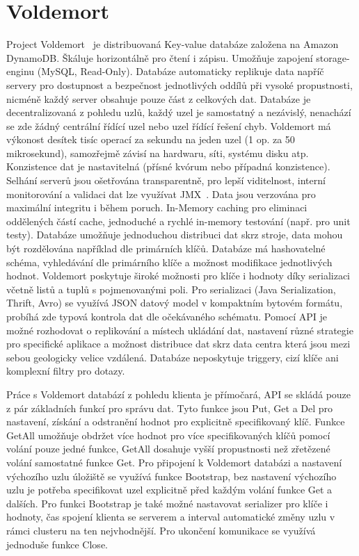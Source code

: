 \documentclass[czech,master,dept460,male,csharp,cpdeclaration]{diploma}
\begin{document}
	\section{Voldemort}
	
	Project Voldemort~\cite{voldemort} je distribuovaná Key-value databáze založena na Amazon DynamoDB. Škáluje horizontálně pro čtení i zápisu. Umožňuje zapojení storage-enginu (MySQL, Read-Only). Databáze automaticky replikuje data napříč servery pro dostupnost a bezpečnost jednotlivých oddílů při vysoké propustnosti, nicméně každý server obsahuje pouze část z celkových dat. Databáze je decentralizovaná z pohledu uzlů, každý uzel je samostatný a nezávislý, nenachází se zde žádný centrální řídící uzel nebo uzel řídící řešení chyb. Voldemort má výkonost desítek tisíc operací za sekundu na jeden uzel (1 op. za 50 mikrosekund), samozřejmě závisí na hardwaru, síti, systému disku atp. Konzistence dat je nastavitelná (přísné kvórum nebo případná konzistence). Selhání serverů jsou ošetřována transparentně, pro lepší viditelnost, interní monitorování a validaci dat lze využívat JMX~\cite{jmx}. Data jsou verzována pro maximální integritu i během poruch. In-Memory caching pro eliminaci oddělených částí cache, jednoduché a rychlé in-memory testování (např. pro unit testy). Databáze umožňuje jednoduchou distribuci dat skrz stroje, data mohou být rozdělována například dle primárních klíčů. Databáze má hashovatelné schéma, vyhledávání dle primárního klíče a možnost modifikace jednotlivých hodnot. Voldemort poskytuje široké možnosti pro klíče i hodnoty díky serializaci včetně listů a tuplů s pojmenovanými poli. Pro serializaci (Java Serialization, Thrift, Avro) se využívá JSON datový model v kompaktním bytovém formátu, probíhá zde typová kontrola dat dle očekávaného schématu. Pomocí API je možné rozhodovat o replikování a místech ukládání dat, nastavení různé strategie pro specifické aplikace a možnost distribuce dat skrz data centra která jsou mezi sebou geologicky velice vzdálená. Databáze neposkytuje triggery, cizí klíče ani komplexní filtry pro dotazy.
	
	Práce s Voldemort databází z pohledu klienta je přímočará, API se skládá pouze z pár základních funkcí pro správu dat. Tyto funkce jsou Put, Get a Del pro nastavení, získání a odstranění hodnot pro explicitně specifikovaný klíč. Funkce GetAll umožňuje obdržet více hodnot pro více specifikovaných klíčů pomocí volání pouze jedné funkce, GetAll dosahuje vyšší propustnosti než zřetězené volání samostatné funkce Get. Pro připojení k Voldemort databázi a nastavení výchozího uzlu úložiště se využívá funkce Bootstrap, bez nastavení výchozího uzlu je potřeba specifikovat uzel explicitně před každým volání funkce Get a dalších. Pro funkci Bootstrap je také možné nastavovat serializer pro klíče i hodnoty, čas spojení klienta se serverem a interval automatické změny uzlu v rámci clusteru na ten nejvhodnější. Pro ukončení komunikace se využívá jednoduše funkce Close.
	
\end{document}
